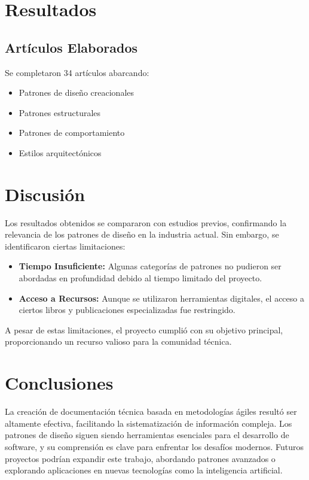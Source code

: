 \documentclass[12pt, a4paper, twocolumn]{article}
\begin{document}
\section{Resultados}
\subsection{Artículos Elaborados}
Se completaron 34 artículos abarcando:
\begin{itemize}
    \item Patrones de diseño creacionales
    \item Patrones estructurales
    \item Patrones de comportamiento
    \item Estilos arquitectónicos
\end{itemize}

\section{Discusión}

Los resultados obtenidos se compararon con estudios previos, confirmando la relevancia de los patrones de diseño en la industria actual. Sin embargo, se identificaron ciertas limitaciones:
\begin{itemize}
    \item \textbf{Tiempo Insuficiente:} Algunas categorías de patrones no pudieron ser abordadas en profundidad debido al tiempo limitado del proyecto.
    \item \textbf{Acceso a Recursos:} Aunque se utilizaron herramientas digitales, el acceso a ciertos libros y publicaciones especializadas fue restringido.
\end{itemize}

A pesar de estas limitaciones, el proyecto cumplió con su objetivo principal, proporcionando un recurso valioso para la comunidad técnica.

\section{Conclusiones}
La creación de documentación técnica basada en metodologías ágiles resultó ser altamente efectiva, facilitando la sistematización de información compleja.
Los patrones de diseño siguen siendo herramientas esenciales para el desarrollo de software, y su comprensión es clave para enfrentar los desafíos modernos. Futuros proyectos podrían expandir este trabajo, abordando patrones avanzados o explorando aplicaciones en nuevas tecnologías como la inteligencia artificial.




\cite{astudillo2014arquitectura, castro2023atencion, cechich2001especificacion, control_chaos2024, cortez2012perfiles, daza2013desarrollo, fernandez2006arquitectura, gil2006uml, navarro2017integracion, navarro2024mejores ,romero2005arquitectura} 
\end{document}
